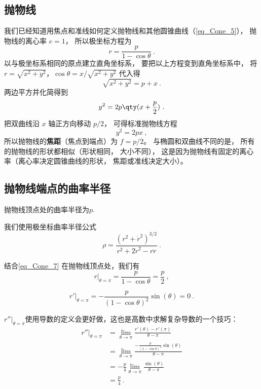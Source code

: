 \subsection{抛物线}

我们已经知道用焦点和准线如何定义抛物线和其他圆锥曲线（\autoref{eq_Cone_5}）， 抛物线的离心率 $e = 1$， 所以极坐标方程为
\begin{equation}\label{eq_Cone_7}
r = \frac{p}{1 - \cos \theta }~.
\end{equation}
以与极坐标系相同的原点建立直角坐标系， 要把以上方程变到直角坐标系中， 将$r = \sqrt{x^2 + y^2}$，$\cos \theta  = x/\sqrt{x^2 + y^2}$ 代入得
\begin{equation}
\sqrt{x^2 + y^2}  = p + x~.
\end{equation}
两边平方并化简得到
\begin{equation}
y^2 = 2p \qty(x + \frac p2)~.
\end{equation}
把双曲线沿 $x$ 轴正方向移动 $p/2$， 可得标准抛物线方程
\begin{equation}\label{eq_Cone_9}
y^2 = 2px~,
\end{equation}
所以抛物线的\textbf{焦距}（焦点到端点）为 $f = p/2$。 与椭圆和双曲线不同的是， 所有的抛物线的形状都相似（形状相同， 大小不同）， 这是因为抛物线有固定的离心率（离心率决定圆锥曲线的形状， 焦距或准线决定大小）。

\subsection{抛物线端点的曲率半径}
抛物线顶点处的曲率半径为$p$.

我们使用极坐标曲率半径公式
\begin{equation}
\rho = \frac{(r^2 + \dot r^2)^{3/2}}{r^2 + 2\dot r^2 - r\ddot r}~.
\end{equation}

结合\autoref{eq_Cone_7} 在抛物线顶点处，我们有
\begin{equation}
r|_{\theta = \pi} = \frac{p}{1 - \cos \theta} = \frac{p}{2}~,
\end{equation}

\begin{equation}
r' |_{\theta = \pi} = -\frac{p}{(1 - \cos \theta)^2} \sin(\theta) = 0~.
\end{equation}

$r'' |_{\theta = \pi}$使用导数的定义会更好做，这也是高数中求解复杂导数的一个技巧：
\begin{equation}
\begin{aligned}
r''|_{\theta = \pi}  &= \lim_{\theta \to \pi} \frac{r'(\theta) - r'(\pi)}{\theta - \pi}\\
&=\lim_{\theta \to \pi} \frac{-\frac{p}{(1 - \cos \theta)^2} \sin(\theta)}{\theta - \pi}\\
&=-\frac{p}{4} \lim_{\theta \to \pi} \frac{\sin(\theta)}{\theta - \pi}\\
&=\frac{p}{4}~.\\
\end{aligned}
\end{equation}


